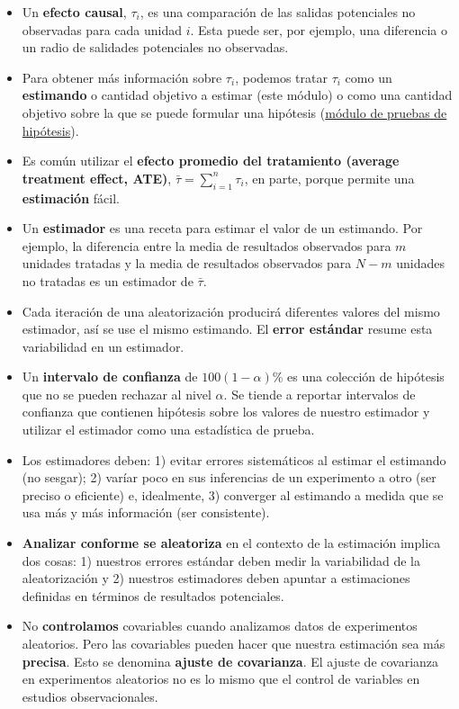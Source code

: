 \documentclass[12pt,spanish,]{book}
\begin{document}
\begin{itemize}
\item
  Un \textbf{efecto causal}, \(\tau_i\), es una comparación de las salidas potenciales no observadas para cada unidad \(i\). Esta puede ser, por ejemplo, una diferencia o un radio de salidades potenciales no observadas.
\item
  Para obtener más información sobre \(\tau_i\), podemos tratar \(\tau_{i}\) como un \textbf{estimando} o cantidad objetivo a estimar (este módulo) o como una cantidad objetivo sobre la que se puede formular una hipótesis (\href{pruebas-de-hipótesis.html}{módulo de pruebas de hipótesis}).
\item
  Es común utilizar el \textbf{efecto promedio del tratamiento (average treatment effect, ATE)}, \(\bar{\tau} = \sum_ {i = 1}^n \tau_{i}\), en parte, porque permite una \textbf{estimación} fácil.
\item
  Un \textbf{estimador} es una receta para estimar el valor de un estimando. Por ejemplo, la diferencia entre la media de resultados observados para \(m\) unidades tratadas y la media de resultados observados para \(N-m\) unidades no tratadas es un estimador de \(\bar{\tau}\).
\item
  Cada iteración de una aleatorización producirá diferentes valores del mismo estimador, así se use el mismo estimando. El \textbf{error estándar} resume esta variabilidad en un estimador.
\item
  Un \textbf{intervalo de confianza} de \(100(1- \alpha)\)\% es una colección de hipótesis que no se pueden rechazar al nivel \(\alpha\). Se tiende a reportar intervalos de confianza que contienen hipótesis sobre los valores de nuestro estimador y utilizar el estimador como una estadística de prueba.
\item
  Los estimadores deben: 1) evitar errores sistemáticos al estimar el estimando (no sesgar); 2) varíar poco en sus inferencias de un experimento a otro (ser preciso o eficiente) e, idealmente, 3) converger al estimando a medida que se usa más y más información (ser consistente).
\item
  \textbf{Analizar conforme se aleatoriza} en el contexto de la estimación implica dos cosas: 1) nuestros errores estándar deben medir la variabilidad de la aleatorización y 2) nuestros estimadores deben apuntar a estimaciones definidas en términos de resultados potenciales.
\item
  No \textbf{controlamos} covariables cuando analizamos datos de experimentos aleatorios. Pero las covariables pueden hacer que nuestra estimación sea más \textbf{precisa}. Esto se denomina \textbf{ajuste de covarianza}. El ajuste de covarianza en experimentos aleatorios no es lo mismo que el control de variables en estudios observacionales.

\end{itemize}
\end{document}
